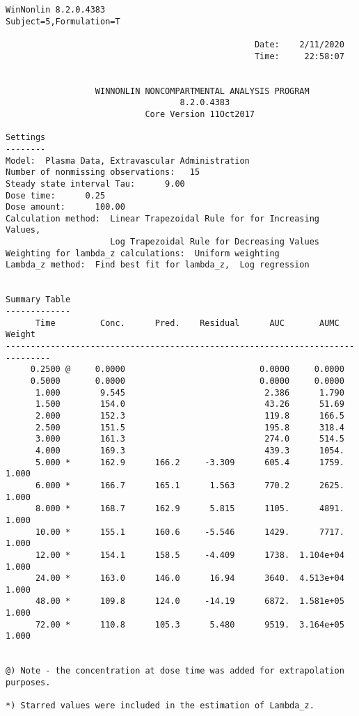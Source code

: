 \documentclass[12pt,a4paper]{article}
\begin{document}
\begin{verbatim}
WinNonlin 8.2.0.4383
Subject=5,Formulation=T

                                                  Date:    2/11/2020
                                                  Time:     22:58:07


                  WINNONLIN NONCOMPARTMENTAL ANALYSIS PROGRAM
                                   8.2.0.4383
                            Core Version 11Oct2017

Settings
--------
Model:  Plasma Data, Extravascular Administration
Number of nonmissing observations:   15
Steady state interval Tau:      9.00
Dose time:      0.25
Dose amount:      100.00
Calculation method:  Linear Trapezoidal Rule for for Increasing Values,
                     Log Trapezoidal Rule for Decreasing Values
Weighting for lambda_z calculations:  Uniform weighting
Lambda_z method:  Find best fit for lambda_z,  Log regression


Summary Table
-------------
      Time         Conc.      Pred.    Residual      AUC       AUMC      Weight
-------------------------------------------------------------------------------
     0.2500 @     0.0000                           0.0000     0.0000
     0.5000       0.0000                           0.0000     0.0000
      1.000        9.545                            2.386      1.790
      1.500        154.0                            43.26      51.69
      2.000        152.3                            119.8      166.5
      2.500        151.5                            195.8      318.4
      3.000        161.3                            274.0      514.5
      4.000        169.3                            439.3      1054.
      5.000 *      162.9      166.2     -3.309      605.4      1759.      1.000
      6.000 *      166.7      165.1      1.563      770.2      2625.      1.000
      8.000 *      168.7      162.9      5.815      1105.      4891.      1.000
      10.00 *      155.1      160.6     -5.546      1429.      7717.      1.000
      12.00 *      154.1      158.5     -4.409      1738.  1.104e+04      1.000
      24.00 *      163.0      146.0      16.94      3640.  4.513e+04      1.000
      48.00 *      109.8      124.0     -14.19      6872.  1.581e+05      1.000
      72.00 *      110.8      105.3      5.480      9519.  3.164e+05      1.000


@) Note - the concentration at dose time was added for extrapolation purposes.

*) Starred values were included in the estimation of Lambda_z.



\end{verbatim}
\end{document}
